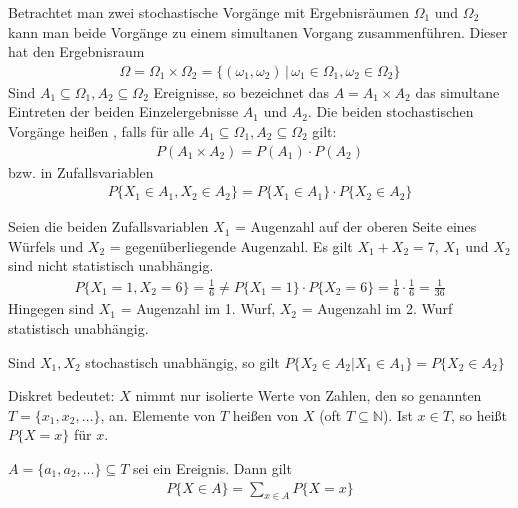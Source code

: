 
Betrachtet man zwei stochastische Vorgänge mit Ergebnisräumen $\Omega _1$ und $\Omega _2$ kann man beide Vorgänge zu einem simultanen Vorgang zusammenführen. Dieser hat den Ergebnisraum
\begin{align*}
    \Omega = \Omega _1 \times \Omega _2 = \{(\omega _1, \omega _2) \,|\, \omega _1 \in \Omega _1, \omega _2 \in \Omega _2\}
\end{align*}
Sind $A_1 \subseteq \Omega _1, A_2 \subseteq \Omega _2$ Ereignisse, so bezeichnet das  $A = A_1 \times A_2$ das simultane Eintreten der beiden Einzelergebnisse $A_1$ und $A_2$. Die beiden stochastischen Vorgänge heißen , falls für alle $A_1 \subseteq \Omega _1, A_2 \subseteq \Omega _2$ gilt:
\begin{align*}
    P(A_1 \times A_2) = P(A_1) \cdot P(A_2)
\end{align*}
bzw. in Zufallsvariablen
\begin{align*}
    P\{X_1 \in A_1, X_2 \in A_2\} = P\{X_1 \in A_1\} \cdot P\{X_2 \in A_2\}
\end{align*}

Seien die beiden Zufallsvariablen $X_1$ = Augenzahl auf der oberen Seite eines Würfels und $X_2$ = gegenüberliegende Augenzahl. Es gilt $X_1 + X_2 = 7$, $X_1$ und $X_2$ sind nicht statistisch unabhängig.
\begin{align*}
    P\{X_1 = 1, X_2 = 6\} = \frac{1}{6} \neq P\{X_1 = 1\} \cdot P\{X_2 = 6\} = \frac{1}{6} \cdot \frac{1}{6} = \frac{1}{36}
\end{align*}
Hingegen sind $X_1$ = Augenzahl im 1. Wurf, $X_2$ = Augenzahl im 2. Wurf statistisch unabhängig.

Sind $X_1, X_2$ stochastisch unabhängig, so gilt $P\{X_2 \in A_2|X_1 \in A_1\} = P\{X_2 \in A_2\}$

Diskret bedeutet: $X$ nimmt nur isolierte Werte von Zahlen, den so genannten  $T = \{x_1, x_2, \dots\}$, an. Elemente von $T$ heißen  von $X$ (oft $T \subseteq \mathbb{N}$). Ist $x \in T$, so heißt $P\{X = x\}$  für $x$.

$A = \{a_1, a_2, \dots\} \subseteq T$ sei ein Ereignis. Dann gilt
\begin{align*}
    P\{X \in A\} = \sum_{x \in A} P\{X = x\}
\end{align*}

